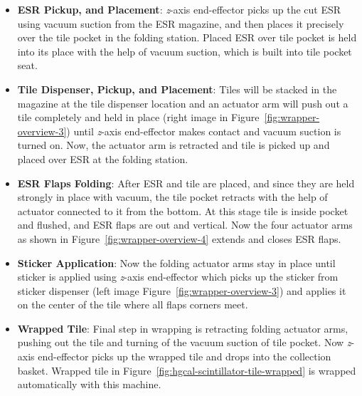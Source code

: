 \begin{itemize}
  \item \textbf{ESR Pickup, and Placement}: \textit{z}-axis end-effector
        picks up the cut \gls{ESR} using vacuum suction from the \gls{ESR} magazine,
        and then places it precisely over the tile pocket in the folding station.
        Placed \gls{ESR} over tile pocket is held into its place with
        the help of vacuum suction, which is built into tile pocket
        seat.
  \item \textbf{Tile Dispenser, Pickup, and Placement}:
        Tiles will be stacked in the magazine at the tile dispenser
        location and an actuator arm will push out a tile
        completely and held in place (right image in Figure~\ref{fig:wrapper-overview-3}) until \textit{z}-axis end-effector
        makes contact and vacuum suction is turned on. Now,
        the actuator arm is retracted and tile is
        picked up and placed over \gls{ESR} at the folding station.
  \item \textbf{ESR Flaps Folding}:
        After \gls{ESR} and tile are placed, and since
        they are held strongly in place with vacuum, the tile pocket
        retracts with the help of actuator connected to it from the bottom.
        At this stage tile is inside pocket and flushed, and \gls{ESR}
        flaps are out and vertical.
        Now the four actuator arms as shown in Figure~\ref{fig:wrapper-overview-4}
        extends and closes \gls{ESR} flaps.
  \item \textbf{Sticker Application}:
        Now the folding actuator arms stay in place until sticker is
        applied using \textit{z}-axis end-effector which
        picks up the sticker from sticker dispenser (left image Figure~\ref{fig:wrapper-overview-3}) and applies it on
        the center of the tile where all flaps corners meet.
  \item \textbf{Wrapped Tile}:
        Final step in wrapping is retracting folding actuator arms,
        pushing out the tile and turning of the vacuum suction of tile pocket.
        Now \textit{z}-axis end-effector picks up the wrapped tile and
        drops into the collection basket.
        Wrapped tile in Figure~\ref{fig:hgcal-scintillator-tile-wrapped}
        is wrapped automatically with this machine.
\end{itemize}

